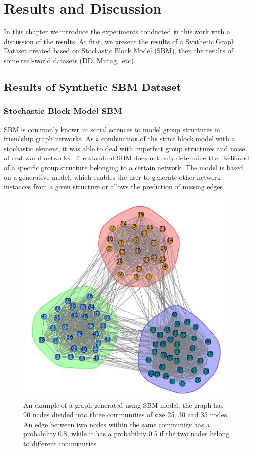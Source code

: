 \addchapheadtotoc
\chapter{Results and Discussion}
In this chapter we introduce the experiments conducted in this work  with a discussion of the results. At first, we present the results of a Synthetic Graph Dataset created based on Stochastic Block Model (SBM), then the results of some real-world datasets (DD, Mutag,..etc).


\section{Results of Synthetic SBM Dataset}
\subsection{Stochastic Block Model SBM}
SBM is commonly known in social sciences to model group structures in friendship graph networks. As a combination of the strict block model with a stochastic element, it was able to deal with imperfect group structures and noise of real world networks. The standard SBM does not only determine the likelihood of a specific group structure belonging to a certain network. The model is based on a generative model, which enables the user to generate other network instances from a given structure or allows the prediction of missing edges \citep{SBM}.

\begin{figure}[H]
\centering
\includegraphics[scale=0.8]{LatexDiss/Dissertation/figs/SBM.JPG}
\caption[Visualization of an SBM-based graph example]{An example of a graph generated using SBM model, the graph has 90 nodes divided into three communities of size 25, 30 and 35 nodes. An edge between two nodes within the same community has a probability 0.8, while it has a probability 0.5 if the two nodes belong to different communities.}
\label{fig:SBM_example}
\end{figure}

